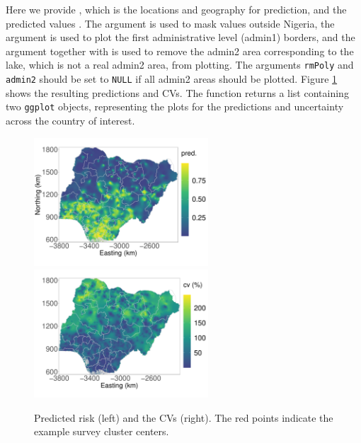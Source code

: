 Here we provide , which is the locations and geography for prediction, and the predicted values .
The argument  is used to mask values outside Nigeria, the argument  is used to plot the first administrative level (admin1) borders, and the argument  together with  is used to remove the admin2 area corresponding to the lake, which is not a real admin2 area, from plotting. The arguments \texttt{rmPoly} and \texttt{admin2} should be set to \texttt{NULL} if all admin2 areas should be plotted. 
Figure \ref{fig:predPlot} shows the resulting predictions and CVs.  The function returns a list containing two \texttt{ggplot} objects, representing the plots for the predictions and uncertainty across the country of interest. 



\begin{figure}
\centering
\includegraphics[height=4.8cm]{pred.pdf} \hspace{.005 \textwidth} \includegraphics[height=4.8cm]{uncertainty.pdf}
\caption{Predicted risk (left) and the CVs (right). The red points indicate the example survey cluster centers.}
\label{fig:predPlot}
\end{figure}


